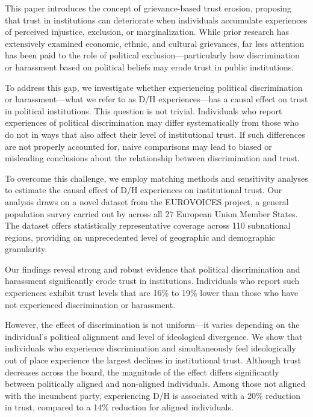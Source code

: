 \documentclass{article}
\begin{document}
This paper introduces the concept of grievance-based trust erosion, proposing that trust in institutions can deteriorate when individuals accumulate experiences of perceived injustice, exclusion, or marginalization. While prior research has extensively examined economic, ethnic, and cultural grievances, far less attention has been paid to the role of political exclusion—particularly how discrimination or harassment based on political beliefs may erode trust in public institutions.

To address this gap, we investigate whether experiencing political discrimination or harassment—what we refer to as D/H experiences—has a causal effect on trust in political institutions. This question is not trivial. Individuals who report experiences of political discrimination may differ systematically from those who do not in ways that also affect their level of institutional trust. If such differences are not properly accounted for, naive comparisons may lead to biased or misleading conclusions about the relationship between discrimination and trust.

To overcome this challenge, we employ matching methods and sensitivity analyses to estimate the causal effect of D/H experiences on institutional trust. Our analysis draws on a novel dataset from the EUROVOICES project, a general population survey carried out by \textcite{the_world_justice_project} across all 27 European Union Member States. The dataset offers statistically representative coverage across 110 subnational regions, providing an unprecedented level of geographic and demographic granularity.

Our findings reveal strong and robust evidence that political discrimination and harassment significantly erode trust in institutions. Individuals who report such experiences exhibit trust levels that are 16\% to 19\% lower than those who have not experienced discrimination or harassment.

However, the effect of discrimination is not uniform—it varies depending on the individual's political alignment and level of ideological divergence. We show that individuals who experience discrimination and simultaneously feel ideologically out of place experience the largest declines in institutional trust. Although trust decreases across the board, the magnitude of the effect differs significantly between politically aligned and non-aligned individuals. Among those not aligned with the incumbent party, experiencing D/H is associated with a 20\% reduction in trust, compared to a 14\% reduction for aligned individuals.
\end{document}
